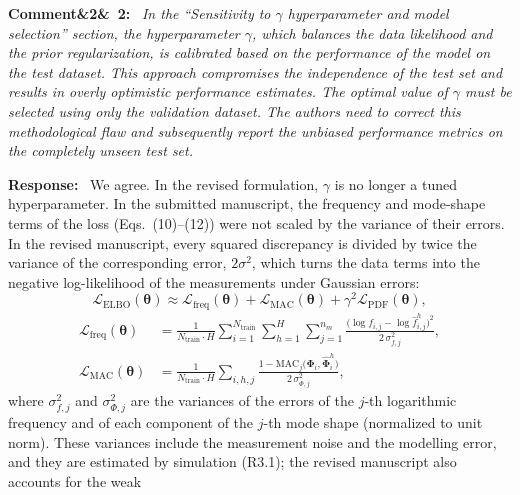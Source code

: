 \documentclass[11pt]{article}
\newenvironment{rcomment}[1]{\par\bigskip\noindent\textbf{Comment\ifx&#1&\else\ #1\fi:}\ \itshape}{\par}
\newenvironment{response}{\par\smallskip\noindent\color{resp}\textbf{Response:}\ }{\par}
\begin{document}
\begin{rcomment}{2}
In the ``Sensitivity to $\gamma$ hyperparameter and model selection'' section, the hyperparameter $\gamma$, which
balances the data likelihood and the prior regularization, is calibrated based on the performance of the model on the
test dataset. This approach compromises the independence of the test set and results in overly optimistic performance
estimates. The optimal value of $\gamma$ must be selected using only the validation dataset. The authors need to
correct this methodological flaw and subsequently report the unbiased performance metrics on the completely unseen test
set.
\end{rcomment}

\begin{response}
We agree. In the revised formulation, $\gamma$ is no longer a tuned hyperparameter. In the submitted manuscript, the
frequency and mode-shape terms of the loss (Eqs.~(10)--(12)) were not scaled by the variance of their errors. In the
revised manuscript, every squared
discrepancy is divided by twice the variance of the corresponding error, $2\sigma^2$, which turns the data terms into the
negative log-likelihood of the measurements under Gaussian errors:
\begin{equation}
\mathcal{L}_{\text{ELBO}}(\bm\theta)\approx\mathcal{L}_{\text{freq}}(\bm\theta)+\mathcal{L}_{\text{MAC}}(\bm\theta)
+\gamma^2\mathcal{L}_{\text{PDF}}(\bm\theta),
\label{eq:loss}
\end{equation}
\begin{equation}
\begin{aligned}
\mathcal{L}_{\text{freq}}(\bm\theta)&=\frac{1}{N_{\text{train}}\cdot H}\sum_{i=1}^{N_{\text{train}}}\sum_{h=1}^{H}
\sum_{j=1}^{n_m}\frac{\big(\log f_{i,j}-\log\hat f_{i,j}^{h}\big)^2}{2\,\sigma_{f,j}^2},\\
\mathcal{L}_{\text{MAC}}(\bm\theta)&=\frac{1}{N_{\text{train}}\cdot H}\sum_{i,h,j}
\frac{1-\mathrm{MAC}_j\big(\bm\Phi_i,\hat{\bm\Phi}_i^{h}\big)}{2\,\sigma_{\Phi,j}^2},
\end{aligned}
\label{eq:nll}
\end{equation}
where $\sigma_{f,j}^2$ and $\sigma_{\Phi,j}^2$ are the variances of the errors of the $j$-th logarithmic frequency and of
each component of the $j$-th mode shape (normalized to unit norm). These variances include the measurement noise and the
modelling error, and they are estimated by simulation (R3.1); the revised manuscript also accounts for the weak

\end{response}
\end{document}
